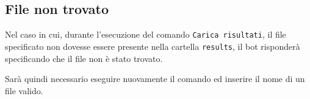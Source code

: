 
\subsection{File non trovato}

Nel caso in cui, durante l'esecuzione del comando \texttt{Carica risultati}, il file specificato non dovesse essere presente nella cartella \texttt{results}, il bot risponderà specificando che il file non è stato trovato. 


Sarà quindi necessario eseguire nuovamente il comando ed inserire il nome di un file valido. 

